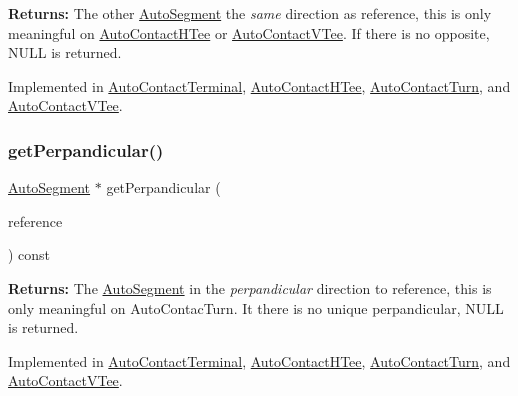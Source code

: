 {\bfseries Returns\+:} The other \mbox{\hyperlink{classKatabatic_1_1AutoSegment}{Auto\+Segment}} the {\itshape same} direction as {\ttfamily reference}, this is only meaningful on \mbox{\hyperlink{classKatabatic_1_1AutoContactHTee}{Auto\+Contact\+H\+Tee}} or \mbox{\hyperlink{classKatabatic_1_1AutoContactVTee}{Auto\+Contact\+V\+Tee}}. If there is no opposite, {\ttfamily N\+U\+LL} is returned. 

Implemented in \mbox{\hyperlink{classKatabatic_1_1AutoContactTerminal_ac9c9b04e245a1109e297510a3968b7ac}{Auto\+Contact\+Terminal}}, \mbox{\hyperlink{classKatabatic_1_1AutoContactHTee_ac9c9b04e245a1109e297510a3968b7ac}{Auto\+Contact\+H\+Tee}}, \mbox{\hyperlink{classKatabatic_1_1AutoContactTurn_ac9c9b04e245a1109e297510a3968b7ac}{Auto\+Contact\+Turn}}, and \mbox{\hyperlink{classKatabatic_1_1AutoContactVTee_ac9c9b04e245a1109e297510a3968b7ac}{Auto\+Contact\+V\+Tee}}.

\mbox{\label{classKatabatic_1_1AutoContact_a994371005874f946cc0ac78005d38423}} 
\subsubsection{\texorpdfstring{get\+Perpandicular()}{getPerpandicular()}}
{\footnotesize\ttfamily \mbox{\hyperlink{classKatabatic_1_1AutoSegment}{Auto\+Segment}} $\ast$ get\+Perpandicular (\begin{DoxyParamCaption}\item[{const \mbox{\hyperlink{classKatabatic_1_1AutoSegment}{Auto\+Segment}} $\ast$}]{reference }\end{DoxyParamCaption}) const\hspace{0.3cm}{\ttfamily [pure virtual]}}

{\bfseries Returns\+:} The \mbox{\hyperlink{classKatabatic_1_1AutoSegment}{Auto\+Segment}} in the {\itshape perpandicular} direction to {\ttfamily reference}, this is only meaningful on Auto\+Contac\+Turn. It there is no unique perpandicular, {\ttfamily N\+U\+LL} is returned. 

Implemented in \mbox{\hyperlink{classKatabatic_1_1AutoContactTerminal_ad99dd549214e43b6509fd8e3aefae919}{Auto\+Contact\+Terminal}}, \mbox{\hyperlink{classKatabatic_1_1AutoContactHTee_ad99dd549214e43b6509fd8e3aefae919}{Auto\+Contact\+H\+Tee}}, \mbox{\hyperlink{classKatabatic_1_1AutoContactTurn_ad99dd549214e43b6509fd8e3aefae919}{Auto\+Contact\+Turn}}, and \mbox{\hyperlink{classKatabatic_1_1AutoContactVTee_ad99dd549214e43b6509fd8e3aefae919}{Auto\+Contact\+V\+Tee}}.



